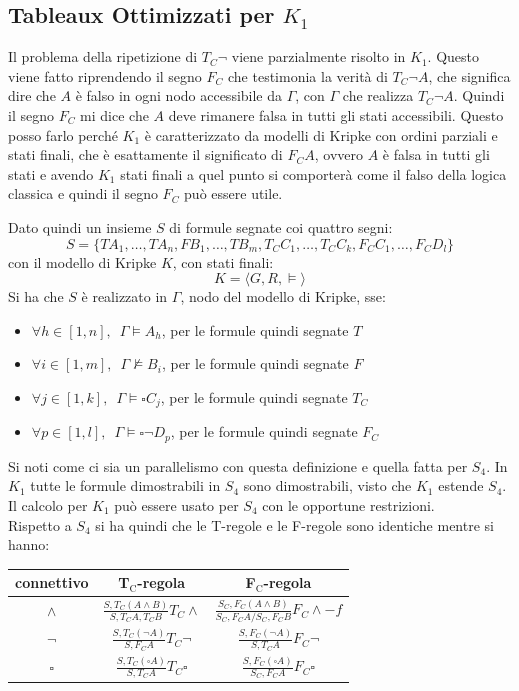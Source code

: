 \documentclass[a4paper,12pt, oneside]{book}
\begin{document}
\subsection{Tableaux Ottimizzati per $K_1$}
Il problema della ripetizione di $T_C\neg$ viene parzialmente risolto in
$K_1$. Questo viene fatto riprendendo il segno $F_C$ che testimonia la verità di
$T_C\neg A$, che significa dire che $A$ è falso in ogni nodo accessibile da
$\Gamma$, con $\Gamma$ che realizza $T_C\neg A$. Quindi il segno $F_C$ mi dice
che $A$ deve rimanere falsa in tutti gli stati accessibili. Questo posso farlo
perché $K_1$ è caratterizzato da modelli di Kripke con ordini parziali e stati
finali, che è esattamente il significato di $F_C A$, ovvero $A$ è falsa in tutti
gli stati e avendo $K_1$ stati finali a quel punto si comporterà come il falso
della logica classica e quindi il segno $F_C$ può essere utile.
\begin{definizione}
  Dato quindi un insieme $S$ di formule segnate coi quattro segni:
  \[S=\{TA_1,\ldots, TA_n,FB_1,\ldots, TB_m,T_CC_1,\ldots, T_CC_k,F_CC_1,\ldots,
    F_CD_l\}\] 
  con il modello di Kripke $K$, con stati finali:
  \[K=\langle G,R,\vDash\rangle\]
  Si ha che $S$ è realizzato in $\Gamma$, nodo del modello di Kripke, sse:
  \begin{itemize}
    \item $\forall h\in [1,n],\,\,\,\Gamma\vDash A_h$, per le formule quindi
    segnate $T$
    \item $\forall i\in [1,m],\,\,\,\Gamma\nvDash B_i$, per le formule quindi
    segnate $F$
    \item $\forall j\in [1,k],\,\,\,\Gamma\vDash \square C_j$, per le formule
    quindi segnate $T_C$
    \item $\forall p\in [1,l],\,\,\,\Gamma\vDash \square \neg D_p$, per le
    formule quindi segnate $F_C$
  \end{itemize}
\end{definizione}
Si noti come ci sia un parallelismo con questa definizione e quella fatta per
$S_4$. In $K_1$ tutte le formule dimostrabili in $S_4$ sono dimostrabili, visto
che $K_1$ estende $S_4$. Il calcolo per $K_1$ può essere usato per $S_4$ con le
opportune restrizioni.\\
Rispetto a $S_4$ si ha quindi che le T-regole e le F-regole sono identiche
mentre si hanno:
\begin{table}[H]
  \Large
  \centering
  \begin{tabular}{c||c|c}
    connettivo& T$_{\mbox{C}}$-regola&F$_{\mbox{C}}$-regola\\
    \hline
    \hline
    $\land$ & $\frac{S,T_C(A\land B)}{S,T_CA,T_CB}T_C\land$&
              $\frac{S_C,F_C(A\land B)}{S_C,F_CA/S_C,F_CB}F_C\land -f$\\
    \hline
    $\neg$ & $\frac{S,T_C(\neg A)}{S,F_CA}T_C\neg$&
            $\frac{S,F_C(\neg A)}{S,T_CA}F_C\neg$\\
    \hline
    $\square$ & $\frac{S,T_C(\square A)}{S,T_CA}T_C\square$ &
               $\frac{S,F_C(\square A)}{S_C,F_CA}F_C\square$
  \end{tabular}
\end{table}
\end{document}
